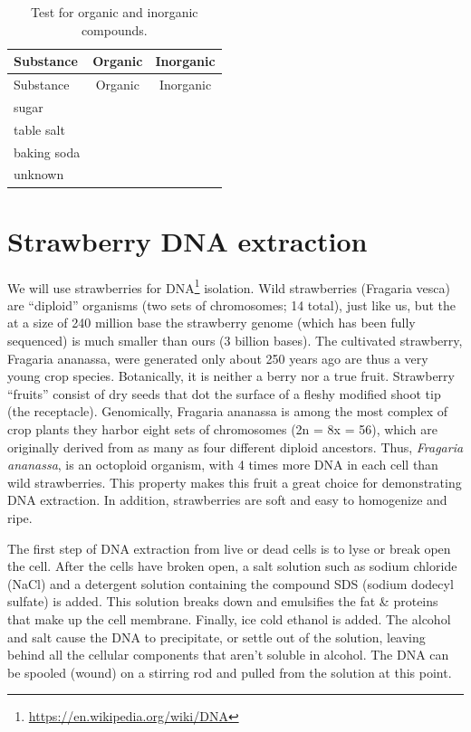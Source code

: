 \documentclass[]{book}
\let\rmarkdownfootnote\footnote%
\def\footnote{\protect\rmarkdownfootnote}
\renewcommand{\href}[2]{#2\footnote{\url{#1}}}
\theoremstyle{definition}
\theoremstyle{definition}
\theoremstyle{definition}
\theoremstyle{remark}
\begin{document}
\begin{longtable}[]{@{}lcc@{}}
\caption{\label{tab:organic} Test for organic and inorganic
compounds.}\tabularnewline
\toprule
Substance & Organic & Inorganic\tabularnewline
\midrule
\endfirsthead
\toprule
Substance & Organic & Inorganic\tabularnewline
\midrule
\endhead
sugar & &\tabularnewline
table salt & &\tabularnewline
baking soda & &\tabularnewline
unknown & &\tabularnewline
\bottomrule
\end{longtable}

\section{Strawberry DNA extraction}\label{strawberry-dna-extraction}

We will use strawberries for
\href{https://en.wikipedia.org/wiki/DNA}{DNA} isolation. Wild
strawberries (Fragaria vesca) are ``diploid'' organisms (two sets of
chromosomes; 14 total), just like us, but the at a size of 240 million
base the strawberry genome (which has been fully sequenced) is much
smaller than ours (3 billion bases). The cultivated strawberry, Fragaria
ananassa, were generated only about 250 years ago are thus a very young
crop species. Botanically, it is neither a berry nor a true fruit.
Strawberry ``fruits'' consist of dry seeds that dot the surface of a
fleshy modified shoot tip (the receptacle). Genomically, Fragaria
ananassa is among the most complex of crop plants they harbor eight sets
of chromosomes (2n = 8x = 56), which are originally derived from as many
as four different diploid ancestors. Thus, \emph{Fragaria ananassa}, is
an octoploid organism, with 4 times more DNA in each cell than wild
strawberries. This property makes this fruit a great choice for
demonstrating DNA extraction. In addition, strawberries are soft and
easy to homogenize and ripe.

The first step of DNA extraction from live or dead cells is to lyse or
break open the cell. After the cells have broken open, a salt solution
such as sodium chloride (NaCl) and a detergent solution containing the
compound SDS (sodium dodecyl sulfate) is added. This solution breaks
down and emulsifies the fat \& proteins that make up the cell membrane.
Finally, ice cold ethanol is added. The alcohol and salt cause the DNA
to precipitate, or settle out of the solution, leaving behind all the
cellular components that aren't soluble in alcohol. The DNA can be
spooled (wound) on a stirring rod and pulled from the solution at this
point.
\end{document}

